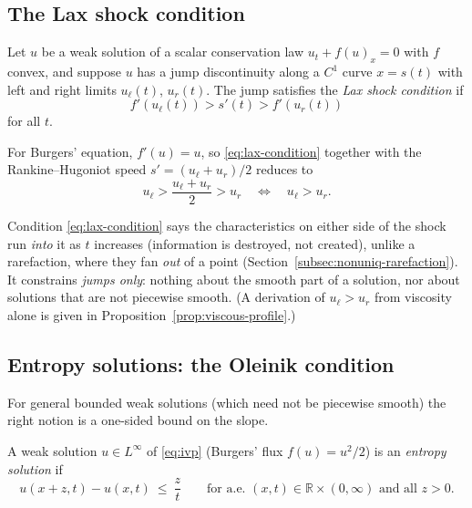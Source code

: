 \subsection{The Lax shock condition}
\label{subsec:lax-condition}

\begin{definition}
\label{def:lax}
Let $u$ be a weak solution of a scalar conservation law $u_t+f(u)_x=0$
with $f$ convex, and suppose $u$ has a jump discontinuity along a $C^1$
curve $x=s(t)$ with left and right limits $u_\ell(t)$, $u_r(t)$. The jump
satisfies the \emph{Lax shock condition} if
\begin{equation}
  \label{eq:lax-condition}
  f'(u_\ell(t)) > s'(t) > f'(u_r(t))
\end{equation}
for all $t$.
\end{definition}

For Burgers' equation, $f'(u)=u$, so \eqref{eq:lax-condition} together
with the Rankine--Hugoniot speed $s'=(u_\ell+u_r)/2$ reduces to
\begin{equation}
  \label{eq:lax-burgers}
  u_\ell > \frac{u_\ell+u_r}{2} > u_r
  \quad \Longleftrightarrow \quad
  u_\ell > u_r.
\end{equation}

\begin{remark}
Condition \eqref{eq:lax-condition} says the characteristics on either side
of the shock run \emph{into} it as $t$ increases (information is destroyed,
not created), unlike a rarefaction, where they fan \emph{out} of a point
(Section~\ref{subsec:nonuniq-rarefaction}). It constrains \emph{jumps only}:
nothing about the smooth part of a solution, nor about solutions that are not
piecewise smooth. (A derivation of $u_\ell>u_r$ from viscosity alone is given
in Proposition~\ref{prop:viscous-profile}.)
\end{remark}

\subsection{Entropy solutions: the Oleinik condition}
\label{subsec:oleinik}

For general bounded weak solutions (which need not be piecewise smooth)
the right notion is a one-sided bound on the slope.

\begin{definition}
\label{def:entropy-solution}
A weak solution $u\in L^\infty$ of \eqref{eq:ivp} (Burgers' flux
$f(u)=u^2/2$) is an \emph{entropy solution} if
\begin{equation}
  \label{eq:oleinik}
  u(x+z,t)-u(x,t)\ \le\ \frac{z}{t}
  \qquad\text{for a.e.\ }(x,t)\in\mathbb{R}\times(0,\infty)\text{ and all }z>0 .
\end{equation}
\end{definition}


